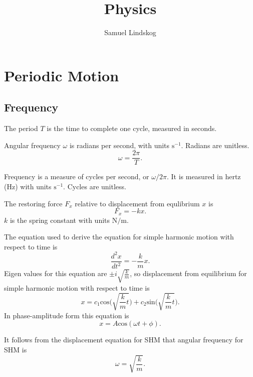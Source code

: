\documentclass{article}
\title{Physics}
\author{Samuel Lindskog}
\begin{document}
\maketitle
{}
\tableofcontents
{}
\clearpage
{}
\setcounter{page}{1}

\section{Periodic Motion}
\subsection{Frequency}
\begin{definition}[Period]
	The period \(T\) is the time to complete one cycle, measured in seconds.
\end{definition}
\begin{definition}
	Angular frequency \(\omega\) is radians per second, with units \(\text{s}^{-1}\). Radians are unitless.
	\begin{equation*}
		\omega=\frac{2\pi}{T}.
	\end{equation*}
\end{definition}
\begin{definition}[Frequency]
	Frequency is a measure of cycles per second, or \(\omega/2\pi\). It is measured in hertz (Hz) with units \(\text{s}^{-1}\). Cycles are unitless.
\end{definition}
\begin{definition}
	The restoring force \(F_x\) relative to displacement from equlibrium \(x\) is
	\begin{equation*}
		F_x=-kx.
	\end{equation*}
	\(k\) is the spring constant with units \(\text{N}/\text{m}\).
\end{definition}
\begin{definition}
	The equation used to derive the equation for simple harmonic motion with respect to time is
	\begin{equation*}
		\frac{d^2x}{dt^2}=-\frac{k}{m}x.
	\end{equation*}
	Eigen values for this equation are \(\pm i\sqrt{\frac{k}{m}}\), so displacement from equilibrium for simple harmonic motion with respect to time is
	\begin{equation*}
		x=c_1\text{cos}\bigg(\sqrt{\frac{k}{m}t}\bigg)+c_2\text{sin}\bigg(\sqrt{\frac{k}{m}t}\bigg).
	\end{equation*}
	In phase-amplitude form this equation is
	\begin{equation*}
		x=A\text{cos}(\omega t+\phi).
	\end{equation*}
\end{definition}
\begin{definition}
	It follows from the displacement equation for SHM that angular frequency for SHM is
	\begin{equation*}
		\omega=\sqrt{\frac{k}{m}}.
	\end{equation*}
\end{definition}
\end{document}
